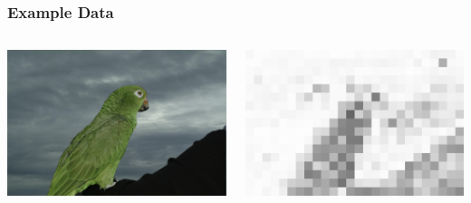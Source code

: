 \documentclass{beamer}
\begin{document}
\begin{frame}
\frametitle{Example Data}
\begin{columns}
\begin{column}{0.5\textwidth}
    \begin{center}
     \includegraphics[width=.9\textwidth]{mask_real}
     \end{center}
\end{column}
\begin{column}{0.5\textwidth}
    \begin{center}
     \includegraphics[width=.9\textwidth]{mask_1}
     \end{center}

\end{column}
\end{columns}
\end{frame}
\end{document}
